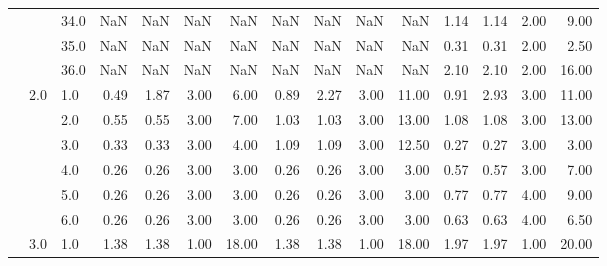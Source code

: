 \begin{tabular}{lllrrrrrrrrrrrr}
       &     & 34.0 &        NaN &       NaN &  NaN &    NaN &        NaN &       NaN &   NaN &    NaN &       1.14 &      1.14 &  2.00 &   9.00 \\
       &     & 35.0 &        NaN &       NaN &  NaN &    NaN &        NaN &       NaN &   NaN &    NaN &       0.31 &      0.31 &  2.00 &   2.50 \\
       &     & 36.0 &        NaN &       NaN &  NaN &    NaN &        NaN &       NaN &   NaN &    NaN &       2.10 &      2.10 &  2.00 &  16.00 \\
       & 2.0 & 1.0  &       0.49 &      1.87 & 3.00 &   6.00 &       0.89 &      2.27 &  3.00 &  11.00 &       0.91 &      2.93 &  3.00 &  11.00 \\
       &     & 2.0  &       0.55 &      0.55 & 3.00 &   7.00 &       1.03 &      1.03 &  3.00 &  13.00 &       1.08 &      1.08 &  3.00 &  13.00 \\
       &     & 3.0  &       0.33 &      0.33 & 3.00 &   4.00 &       1.09 &      1.09 &  3.00 &  12.50 &       0.27 &      0.27 &  3.00 &   3.00 \\
       &     & 4.0  &       0.26 &      0.26 & 3.00 &   3.00 &       0.26 &      0.26 &  3.00 &   3.00 &       0.57 &      0.57 &  3.00 &   7.00 \\
       &     & 5.0  &       0.26 &      0.26 & 3.00 &   3.00 &       0.26 &      0.26 &  3.00 &   3.00 &       0.77 &      0.77 &  4.00 &   9.00 \\
       &     & 6.0  &       0.26 &      0.26 & 3.00 &   3.00 &       0.26 &      0.26 &  3.00 &   3.00 &       0.63 &      0.63 &  4.00 &   6.50 \\
       & 3.0 & 1.0  &       1.38 &      1.38 & 1.00 &  18.00 &       1.38 &      1.38 &  1.00 &  18.00 &       1.97 &      1.97 &  1.00 &  20.00 \\
\bottomrule
\end{tabular}
